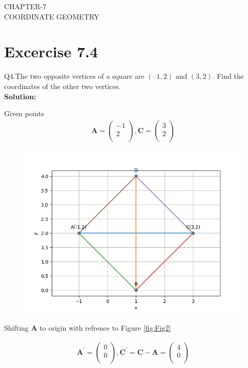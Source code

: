 \documentclass[12pt]{article}
\newcommand{\solution}{\noindent \textbf{Solution: }}
\newcommand{\myvec}[1]{\ensuremath{\begin{pmatrix}#1\end{pmatrix}}}
\let\vec\mathbf
\begin{document}
\begin{center}
\textbf\large{CHAPTER-7 \\ COORDINATE GEOMETRY}

\end{center}
\section*{Excercise 7.4}

Q4.The two opposite vertices of a square are $(–1, 2) \text{ and } (3, 2)$. Find the coordinates of the other two vertices.\\
\solution

Given points 
\begin{align}
\vec{A} = \myvec
{
-1 \\
 2\\
},
\vec{C} = 
\myvec
{
3\\
2\\
}
\end{align}

\begin{figure}[!h]
	\begin{center} 
	    \includegraphics[width=\columnwidth]{figs/square}
	\end{center}
\caption{}
\label{fig:Fig1}
\end{figure}

Shifting $\vec{A}$ to origin with refrence to Figure \ref{fig:Fig2}

\begin{align}
\vec{A^{\prime}} =
\myvec{
0 \\
0\\
},
\vec{C^{\prime}} = \vec{C}-\vec{A} = 
\myvec{
4 \\
0\\
}
\end{align}
\end{document}
